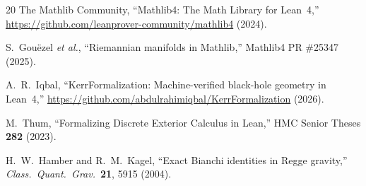 \documentclass[11pt,a4paper]{article}
\begin{document}
\begin{thebibliography}{20}
 The Mathlib Community,
``Mathlib4: The Math Library for Lean~4,''
\url{https://github.com/leanprover-community/mathlib4} (2024).

 S.~Gou\"ezel \textit{et al.},
``Riemannian manifolds in Mathlib,''
Mathlib4 PR \#25347 (2025).

 A.~R.~Iqbal,
``KerrFormalization: Machine-verified black-hole geometry in Lean~4,''
\url{https://github.com/abdulrahimiqbal/KerrFormalization} (2026).

 M.~Thum,
``Formalizing Discrete Exterior Calculus in Lean,''
HMC Senior Theses \textbf{282} (2023).

 H.~W.~Hamber and R.~M.~Kagel,
``Exact Bianchi identities in Regge gravity,''
\textit{Class.\ Quant.\ Grav.}\ \textbf{21}, 5915 (2004).

\end{thebibliography}
\end{document}
